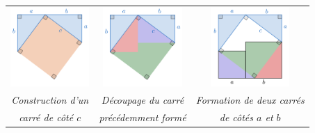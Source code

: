 \documentclass[a4paper, twoside]{article}
\begin{document}
\begin{center}
	\begin{tabular}{ccc}
		\includegraphics[width=3cm]{Image/Pythagore/figure_hypo_cas_1.png} & \includegraphics[width=3cm]{Image/Pythagore/figure_hypo_cas_2.png} & \includegraphics[width=3cm]{Image/Pythagore/figure_hypo_cas_3.png} \\
		\textit{Construction d'un}                       & \textit{Découpage du carré}                     & \textit{Formation de deux carrés}              \\
		\textit{carré de côté $c$}                       & \textit{précédemment formé}                     & \textit{de côtés $a$ et $b$}              \\
	\end{tabular}
\end{center}






\end{document}
